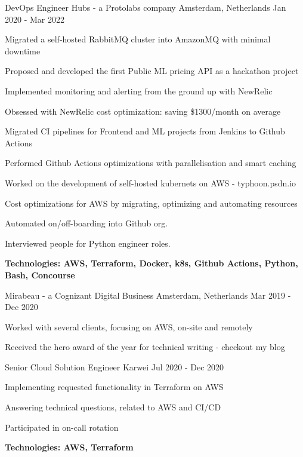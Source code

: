 \begin{cventries}
\cventry
{DevOps Engineer} %
{Hubs - a Protolabs company} %
{Amsterdam, Netherlands} %
{Jan 2020 - Mar 2022} %
{ %
	\begin{cvitems}
		\item {Migrated a self-hosted RabbitMQ cluster into AmazonMQ with minimal downtime}
		\item {Proposed and developed the first Public ML pricing API as a hackathon project}
		\item {Implemented monitoring and alerting from the ground up with NewRelic}
		\item {Obsessed with NewRelic cost optimization: saving \$1300/month on average}
		\item {Migrated CI pipelines for Frontend and ML projects from Jenkins to Github Actions}
		\item {Performed Github Actions optimizations with parallelisation and smart caching}
		\item {Worked on the development of self-hosted kubernets on AWS - typhoon.psdn.io}
		\item {Cost optimizations for AWS by migrating, optimizing and automating resources}
		\item {Automated on/off-boarding into Github org.}
		\item {Interviewed people for Python engineer roles.}
		\item {\bfseries{Technologies:} AWS, Terraform, Docker, k8s, Github Actions, Python, Bash, Concourse}
	\end{cvitems}
}


{Mirabeau - a Cognizant Digital Business}
{Amsterdam, Netherlands}
{Mar 2019 - Dec 2020}
{
	\begin{cvitems}
		\item {Worked with several clients, focusing on AWS, on-site and remotely}
		\item {Received the hero award of the year for technical writing - checkout my blog}
	\end{cvitems}
}

\hfill\begin{minipage}{\dimexpr\textwidth-1cm}
\xdef\tpd{\the\prevdepth}
\begin{cventrystack}
	\cventry
	{Senior Cloud Solution Engineer} %
	{Karwei} %
	{} %
	{Jul 2020 - Dec 2020} %
	{
		\begin{cvitems}
			\item {Implementing requested functionality in Terraform on AWS}
			\item {Answering technical questions, related to AWS and CI/CD}
			\item {Participated in on-call rotation}
			\item {\bfseries{Technologies:} AWS, Terraform}
		\end{cvitems}
	}


\end{cventrystack}
\end{minipage}
\end{cventries}
